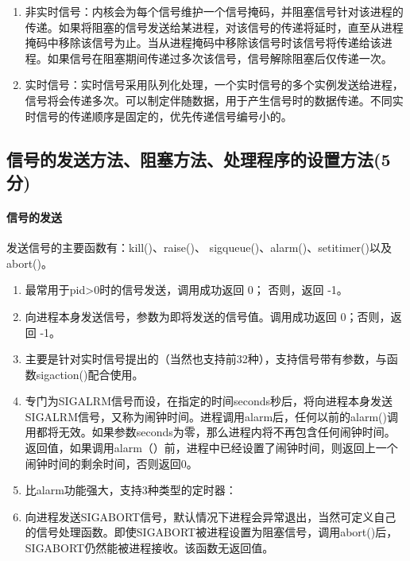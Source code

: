 \begin{enumerate}
    \item 非实时信号：内核会为每个信号维护一个信号掩码，并阻塞信号针对该进程的传递。如果将阻塞的信号发送给某进程，对该信号的传递将延时，直至从进程掩码中移除该信号为止。当从进程掩码中移除该信号时该信号将传递给该进程。如果信号在阻塞期间传递过多次该信号，信号解除阻塞后仅传递一次。
    \item 实时信号：实时信号采用队列化处理，一个实时信号的多个实例发送给进程，信号将会传递多次。可以制定伴随数据，用于产生信号时的数据传递。不同实时信号的传递顺序是固定的，优先传递信号编号小的。
\end{enumerate}

\subsection{信号的发送方法、阻塞方法、处理程序的设置方法(5分)}
\paragraph{信号的发送}发送信号的主要函数有：kill()、raise()、 sigqueue()、alarm()、setitimer()以及abort()。
\begin{enumerate}
    \item {}最常用于pid>0时的信号发送，调用成功返回 0； 否则，返回 -1。
    \item {}向进程本身发送信号，参数为即将发送的信号值。调用成功返回 0；否则，返回 -1。
    \item {} 主要是针对实时信号提出的（当然也支持前32种），支持信号带有参数，与函数sigaction()配合使用。
    \item {}专门为SIGALRM信号而设，在指定的时间seconds秒后，将向进程本身发送SIGALRM信号，又称为闹钟时间。进程调用alarm后，任何以前的alarm()调用都将无效。如果参数seconds为零，那么进程内将不再包含任何闹钟时间。 
    返回值，如果调用alarm（）前，进程中已经设置了闹钟时间，则返回上一个闹钟时间的剩余时间，否则返回0。
    \item {}比alarm功能强大，支持3种类型的定时器：
    \item {} 向进程发送SIGABORT信号，默认情况下进程会异常退出，当然可定义自己的信号处理函数。即使SIGABORT被进程设置为阻塞信号，调用abort()后，SIGABORT仍然能被进程接收。该函数无返回值。
\end{enumerate}

